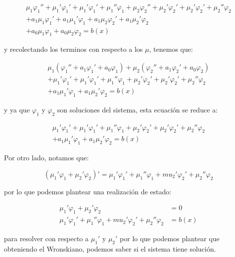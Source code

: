 		\begin{multline*}
			\mu_1 \varphi_1'' + \mu_1' \varphi_1' + \mu_1' \varphi_1' + \mu_1'' \varphi_1 + \mu_2 \varphi_2'' + \mu_2' \varphi_2' + \mu_2' \varphi_2' + \mu_2'' \varphi_2 \\
			+ a_1 \mu_1 \varphi_1' + a_1 \mu_1' \varphi_1 + a_1 \mu_2 \varphi_2' + a_1 \mu_2' \varphi_2 \\
			+ a_0 \mu_1 \varphi_1 + a_0 \mu_2 \varphi_2 = b(x)
		\end{multline*}

		y recolectando los terminos con respecto a los $\mu$, tenemos que:

		\begin{multline*}
			\mu_1 (\varphi_1'' + a_1 \varphi_1' + a_0 \varphi_1) + \mu_2 (\varphi_2'' + a_1 \varphi_2' + a_0 \varphi_2) \\
			+ \mu_1' \varphi_1' + \mu_1' \varphi_1' + \mu_1'' \varphi_1 + \mu_2' \varphi_2' + \mu_2' \varphi_2' + \mu_2'' \varphi_2 \\
			+ a_1 \mu_1' \varphi_1 + a_1 \mu_2' \varphi_2 = b(x)
		\end{multline*}

		y ya que $\varphi_1$ y $\varphi_2$ son soluciones del sistema, esta ecuación se reduce a:

		\begin{multline*}
			\mu_1' \varphi_1' + \mu_1' \varphi_1' + \mu_1'' \varphi_1 + \mu_2' \varphi_2' + \mu_2' \varphi_2' + \mu_2'' \varphi_2 \\
			+ a_1 \mu_1' \varphi_1 + a_1 \mu_2' \varphi_2 = b(x)
		\end{multline*}

		Por otro lado, notamos que:

		\begin{equation*}
			(\mu_1' \varphi_1 + \mu_2' \varphi_2)' = \mu_1' \varphi_1' + \mu_1'' \varphi_1 + mu_2' \varphi_2' + \mu_2'' \varphi_2
		\end{equation*}

		por lo que podemos plantear una realización de estado:

		\begin{align*}
			\mu_1' \varphi_1 + \mu_2' \varphi_2 &= 0 \\
			\mu_1' \varphi_1' + \mu_1'' \varphi_1 + mu_2' \varphi_2' + \mu_2'' \varphi_2 &= b(x)
		\end{align*}

		para resolver con respecto a $\mu_1'$ y $\mu_2'$ por lo que podemos plantear que obteniendo el Wronskiano, podemos saber si el sistema tiene solución.

